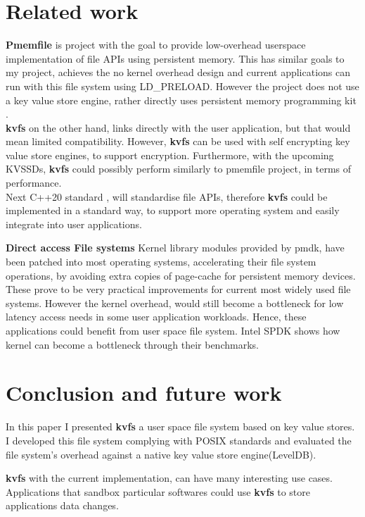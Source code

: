 \documentclass[bsc,frontabs,twoside,singlespacing,parskip,deptreport]{infthesis}     %
\begin{document}
{\chapter{Related work}
\textbf{Pmemfile} \cite{pmemfile} is project with the goal to provide low-overhead userspace implementation of file APIs using persistent memory. This has similar goals to my project, achieves the no kernel overhead design and current applications can run with this file system using LD\_PRELOAD. However the project does not use a key value store engine, rather directly uses persistent memory programming kit \cite{pmdk}.
\\ {\bf kvfs} on the other hand, links directly with the user application, but that would mean limited compatibility. However, {\bf kvfs} can be used with self encrypting key value store engines, to support encryption. Furthermore, with the upcoming KVSSDs, {\bf kvfs} could possibly perform similarly to pmemfile project, in terms of performance.
\\ Next C++20 standard \cite{std_fs}, will standardise file APIs, therefore {\bf kvfs} could be implemented in a standard way, to support more operating system and easily integrate into user applications.

\textbf{Direct access File systems}
Kernel library modules provided by pmdk\cite{pmdk}, have been patched into most operating systems, accelerating their file system operations, by avoiding extra copies of page-cache for persistent memory devices. These prove to be very practical improvements for current most widely used file systems. However the kernel overhead, would still become a bottleneck for low latency access needs in some user application workloads. Hence, these applications could benefit from user space file system. Intel SPDK\cite{spdk} shows how kernel can become a bottleneck through their benchmarks.

\chapter{Conclusion and future work}
In this paper I presented {\bf kvfs} a user space file system based on key value stores. I developed this file system complying with POSIX standards and evaluated the file system's overhead against a native key value store engine(LevelDB). 

{\bf kvfs} with the current implementation, can have many interesting use cases. Applications that sandbox particular softwares could use {\bf kvfs} to store applications data changes.

}
\end{document}
